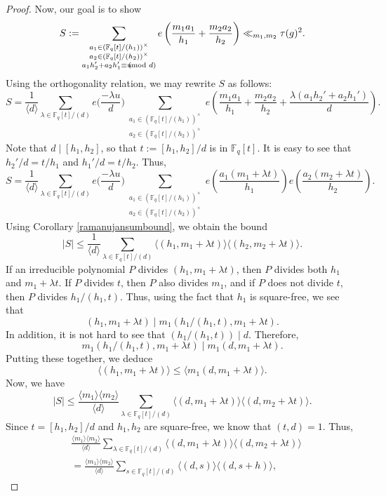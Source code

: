 \documentclass{article}
\theoremstyle{definition}
\theoremstyle{definition}
\theoremstyle{remark}
\newcommand{\F}{\mathbb{F}_q[t]}
\newcommand{\1}{\mathbf{1}}
\numberwithin{equation}{section}
\begin{document}
\begin{proof}
Now, our goal is to show 
\[S:=\sum_{\substack{a_1\in (\F/(h_1))^\times\\a_2\in (\F/(h_2))^\times\\a_1h_2'+a_2h_1'\equiv u\hspace*{-2.5mm}\pmod{d}}}e\left(\frac{m_1a_1}{h_1}+\frac{m_2a_2}{h_2}\right)\ll_{m_1,m_2}\tau(g)^2.\]
Using the orthogonality relation, we may rewrite $S$ as follows: 
\[
S=
\frac{1}{\langle d \rangle }\sum_{\lambda\in \F\slash (d)}e\bigg(\frac{-\lambda u}{d}\bigg) \sum_{\substack{a_1\in (\F/(h_1))^\times\\a_2\in (\F/(h_2))^\times}}e\left(\frac{m_1a_1}{h_1}+\frac{m_2a_2}{h_2}+\frac{\lambda(a_1h_2'+a_2h_1')}{d}\right).
\]
Note that $d\mid [h_1,h_2]$, so that $t:=[h_1,h_2]\slash d$ is in $\F$. It is easy to see that $h_2'\slash d=t\slash h_1$ and $h_1'\slash d=t\slash h_2$. Thus, 
\[S=\frac{1}{\langle d \rangle }\sum_{\lambda\in \F\slash (d)}e\bigg(\frac{-\lambda u}{d}\bigg)\sum_{\substack{a_1\in (\F/(h_1))^\times\\a_2\in (\F/(h_2))^\times}}e\left(\frac{a_1(m_1+\lambda t)}{h_1}\right)e\left(\frac{a_2(m_2+\lambda t)}{h_2}\right).\]
Using Corollary \ref{ramanujansumbound}, we obtain the bound 
\[|S|\leq \frac{1}{\langle d \rangle }\sum_{\lambda\in \F\slash (d)}\langle (h_1,m_1+\lambda t)\rangle \langle (h_2,m_2+\lambda t)\rangle.\]
If an irreducible polynomial $P$ divides $(h_1,m_1+\lambda t)$, then $P$ divides both $h_1$ and $m_1+\lambda t$. If $P$ divides $t$, then $P$ also divides $m_1$, and if $P$ does not divide $t$, then $P$ divides $h_1\slash (h_1,t)$. Thus, using the fact that $h_1$ is square-free, we see that 
\[(h_1,m_1+\lambda t)\mid m_1(h_1\slash (h_1,t), m_1+\lambda t).\]
In addition, it is not hard to see that $(h_1\slash (h_1,t))\mid d$. Therefore, 
\[m_1(h_1\slash (h_1,t), m_1+\lambda t)\mid m_1(d, m_1+\lambda t).\]
Putting these together, we deduce
\[\langle(h_1, m_1+\lambda t) \rangle\leq \langle m_1(d,m_1+\lambda t)\rangle. \]
Now, we have 
\[|S|\leq \frac{\langle m_1\rangle \langle m_2\rangle }{\langle d \rangle }\sum_{\lambda\in \F\slash (d)}\langle (d,m_1+\lambda t)\rangle \langle (d,m_2+\lambda t)\rangle.\]
Since $t=[h_1,h_2]\slash d$ and $h_1,h_2$ are square-free, we know that $(t,d)=1$. Thus,
\begin{align*}
&\frac{\langle m_1\rangle \langle m_2\rangle }{\langle d \rangle }\sum_{\lambda\in \F\slash (d)}\langle (d,m_1+\lambda t)\rangle \langle (d,m_2+\lambda t)\rangle\\
&=\frac{\langle m_1\rangle \langle m_2\rangle }{\langle d \rangle }\sum_{s\in \F\slash (d)}\langle (d,s)\rangle \langle (d,s+h)\rangle,

\end{align*}
\end{proof}
\end{document}
